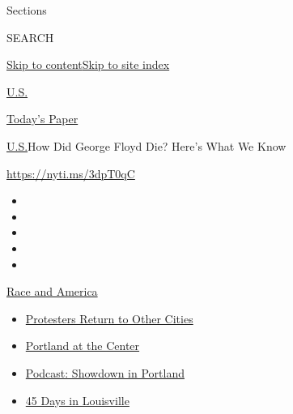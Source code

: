 Sections

SEARCH

\protect\hyperlink{site-content}{Skip to
content}\protect\hyperlink{site-index}{Skip to site index}

\href{https://www.nytimes3xbfgragh.onion/section/us}{U.S.}

\href{https://myaccount.nytimes3xbfgragh.onion/auth/login?response_type=cookie\&client_id=vi}{}

\href{https://www.nytimes3xbfgragh.onion/section/todayspaper}{Today's
Paper}

\href{/section/us}{U.S.}\textbar{}How Did George Floyd Die? Here's What
We Know

\url{https://nyti.ms/3dpT0qC}

\begin{itemize}
\item
\item
\item
\item
\item
\end{itemize}

\href{https://www.nytimes3xbfgragh.onion/news-event/george-floyd-protests-minneapolis-new-york-los-angeles?action=click\&pgtype=Article\&state=default\&region=TOP_BANNER\&context=storylines_menu}{Race
and America}

\begin{itemize}
\tightlist
\item
  \href{https://www.nytimes3xbfgragh.onion/2020/07/26/us/protests-portland-seattle-trump.html?action=click\&pgtype=Article\&state=default\&region=TOP_BANNER\&context=storylines_menu}{Protesters
  Return to Other Cities}
\item
  \href{https://www.nytimes3xbfgragh.onion/2020/07/24/us/portland-oregon-protests-white-race.html?action=click\&pgtype=Article\&state=default\&region=TOP_BANNER\&context=storylines_menu}{Portland
  at the Center}
\item
  \href{https://www.nytimes3xbfgragh.onion/2020/07/23/podcasts/the-daily/portland-protests.html?action=click\&pgtype=Article\&state=default\&region=TOP_BANNER\&context=storylines_menu}{Podcast:
  Showdown in Portland}
\item
  \href{https://www.nytimes3xbfgragh.onion/interactive/2020/07/16/us/black-lives-matter-protests-louisville-breonna-taylor.html?action=click\&pgtype=Article\&state=default\&region=TOP_BANNER\&context=storylines_menu}{45
  Days in Louisville}
\end{itemize}

